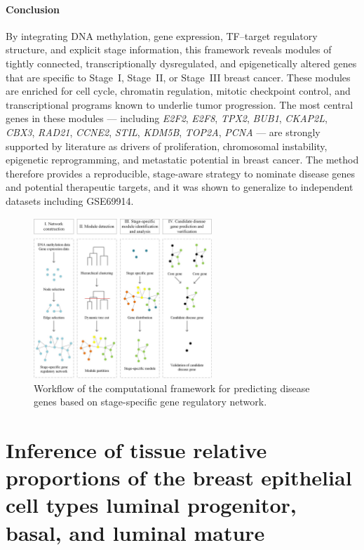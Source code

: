 \documentclass[10pt]{extarticle}
\begin{document}
\paragraph{Conclusion}
By integrating DNA methylation, gene expression, TF--target regulatory structure, and explicit stage information, this framework reveals modules of tightly connected, transcriptionally dysregulated, and epigenetically altered genes that are specific to Stage~I, Stage~II, or Stage~III breast cancer. These modules are enriched for cell cycle, chromatin regulation, mitotic checkpoint control, and transcriptional programs known to underlie tumor progression. The most central genes in these modules --- including \textit{E2F2}, \textit{E2F8}, \textit{TPX2}, \textit{BUB1}, \textit{CKAP2L}, \textit{CBX3}, \textit{RAD21}, \textit{CCNE2}, \textit{STIL}, \textit{KDM5B}, \textit{TOP2A}, \textit{PCNA} --- are strongly supported by literature as drivers of proliferation, chromosomal instability, epigenetic reprogramming, and metastatic potential in breast cancer. The method therefore provides a reproducible, stage-aware strategy to nominate disease genes and potential therapeutic targets, and it was shown to generalize to independent datasets including GSE69914.

\begin{figure}[H]
    \centering
    \includegraphics[width=0.6\textwidth]{Figures/Workflow of the computational framework for predicting disease genes based on stage-specific gene regulatory network.jpg} %
    \caption{Workflow of the computational framework for predicting disease genes based on stage-specific gene regulatory network.}
    \label{fig:Workflow}
\end{figure}


\section{Inference of tissue relative proportions of the breast epithelial cell types luminal progenitor, basal, and luminal mature}
\end{document}
